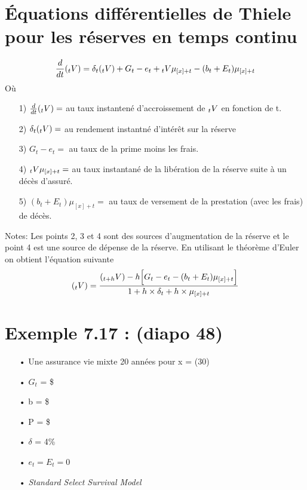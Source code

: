 \documentclass[11pt,french]{report}
\newcommand{\indiceGauche}[2]{{\vphantom{#2}}_{#1}#2}
\begin{document}
\section{Équations différentielles de Thiele pour les réserves en temps continu}
\begin{equation}
\frac{d}{dt} (\indiceGauche{t}{V}) = \delta_t (\indiceGauche{t}{V}) + G_t - e_t + \indiceGauche{t}{V} \mu_{[x]+t} - (b_t + E_t)\mu_{[x]+t} 
\end{equation}
Où
\begin{itemize}
\item[1)] $\frac{d}{dt} (\indiceGauche{t}{V}) =$ au taux instantené d'accroissement de $\indiceGauche{t}{V}$ en fonction de t.
\item[2)] $\delta_t (\indiceGauche{t}{V}) = $ au rendement instantné d'intérêt sur la réserve
\item[3)] $G_t - e_t = $ au taux de la prime moins les frais.
\item[4)] $\indiceGauche{t}{V} \mu_{[x]+t} =$ au taux instantané de la libération de la réserve suite à un décès d'assuré.
\item[5)] $(b_t + E_t)\mu_{[x]+t} =$ au taux de versement de la prestation (avec les frais) de décès.
\end{itemize}
Notes: Les points 2, 3 et 4 sont des sources d'augmentation de la réserve et le point 4 est une source de dépense de la réserve.
En utilisant le théorème d'Euler on obtient l'équation suivante
\begin{equation}
(\indiceGauche{t}{V}) = \frac{(\indiceGauche{t + h}{V}) - h \Big[ G_t - e_t - (b_t + E_t)\mu_{[x]+t} \Big] }{1 + h \times \delta_t + h \times \mu_{[x]+t} } 
\end{equation}

\section{Exemple 7.17 : (diapo 48)}
\begin{itemize}
\item[•] Une assurance vie mixte 20 années pour x = (30)
\item[•] $G_t$ = \$
\item[•] b = \$
\item[•] P = \$
\item[•] $\delta$ = 4\%
\item[•] $e_t = E_t = 0$ 
\item[•] \emph{Standard Select Survival Model}
\end{itemize}
\end{document}

